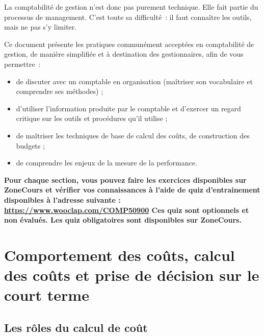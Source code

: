 \documentclass[oneside]{kaobook}
\begin{document}
La comptabilité de gestion n'est donc pas purement technique. Elle fait partie du processus de management. C'est toute sa difficulté : il faut connaître les outils, mais ne pas s'y limiter.


\begin{kaobox}
Ce document présente les pratiques communément acceptées en comptabilité de gestion, de manière simplifiée et à destination des gestionnaires, afin de vous permettre :
\begin{itemize}
\item de discuter avec un comptable en organisation (maîtriser son vocabulaire et comprendre ses méthodes) ;
\item d'utiliser l’information produite par le comptable et d'exercer un regard critique sur les outils et procédures qu’il utilise ;
\item de maîtriser les techniques de base de calcul des coûts, de construction des budgets ;
\item de comprendre les enjeux de la mesure de la performance.
\end{itemize}
\textbf{Pour chaque section, vous pouvez faire les exercices disponibles sur ZoneCours et vérifier vos connaissances à l'aide de quiz d’entrainement disponibles à l'adresse suivante : \url{https://www.wooclap.com/COMP50900} 
Ces quiz sont optionnels et non évalués. Les quiz obligatoires sont disponibles sur ZoneCours.}
\end{kaobox}

\chapter{Comportement des coûts, calcul des coûts et prise de décision sur le court terme}
\label{sec:org647abec}
\section{Les rôles du calcul de coût}
\label{sec:org25ad891}
\end{document}
